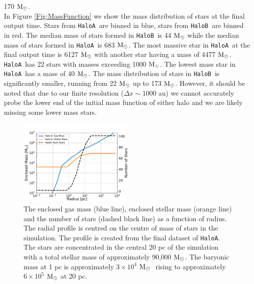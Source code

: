 \documentclass[twocolumn,iop,revtex4]{openjournal}
\newcommand{\msolar} {$\rm{M_{\odot}}~$}
\newcommand{\msolarc} {$\rm{M_{\odot}}$}
\newcommand{\ha} {\texttt{HaloA~}}
\newcommand{\hb} {\texttt{HaloB~}}
\newcommand{\hac} {\texttt{HaloA}}
\begin{document}
170 \msolarc.\\
\indent In Figure \ref{Fig:MassFunction} we show the mass distribution of stars at the final
output time. Stars from \ha are binned in blue, stars from \hb are binned in red. The median mass
of stars formed in \hb is 44 \msolar while the median mass of stars formed in \ha is 683 \msolarc.
The most massive star in \ha at the final output time is 6127 \msolar with another star having a mass
of 4477 \msolarc. \ha has 22 stars with masses exceeding 1000 \msolarc. The lowest mass star in
\ha has a mass of 40 \msolarc. The mass distribution of stars in \hb is significantly smaller, running
from 22 \msolar up to 173 \msolarc. However, it should be noted that due to our finite resolution
($\Delta x \sim 1000$ au) we cannot accurately probe the lower end of the initial mass function
of either halo and we are likely missing some lower mass stars. 
\begin{figure}
   \centering 
\includegraphics[width=0.5\textwidth]{FIGURES/EnclosedMass.pdf}
\caption{The enclosed gas mass (blue line), enclosed stellar mass (orange line) and the number of
stars (dashed black line) as a function of radius. The radial profile is centred on the centre
of mass of stars in the simulation. The profile is created from the final dataset of \hac.
The stars are concentrated in the central 20 pc of the simulation with a total stellar mass of
approximately 90,000 \msolarc. The baryonic mass at 1 pc is approximately $3 \times 10^4$ \msolar
rising to approximately $6 \times 10^5$ \msolar at 20 pc. }
\label{Fig:EnclosedMass}
\end{figure}
\end{document}
